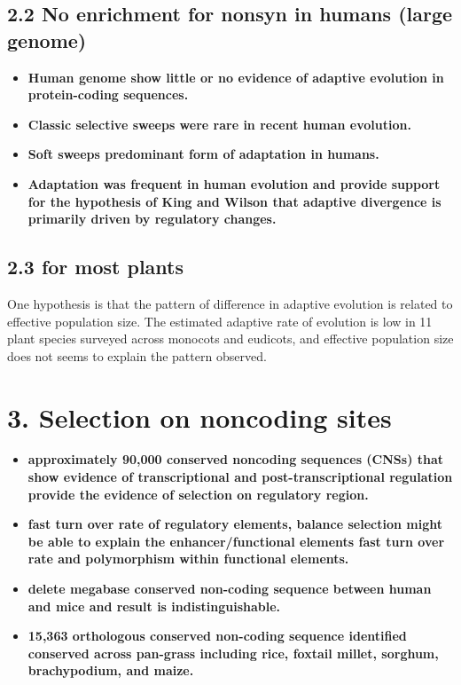 \documentclass[12pt]{article}
\begin{document}
\subsection*{2.2 No enrichment for nonsyn in humans (large genome)}
\begin{itemize}
\item \textbf{Human genome show little or no evidence of adaptive evolution in protein-coding sequences.}

\item \textbf{Classic selective sweeps were rare in recent human evolution.}

\item \textbf{Soft sweeps predominant form of adaptation in humans.}

\item \textbf{Adaptation was frequent in human evolution and provide support for the hypothesis of King and Wilson that adaptive divergence is primarily driven by regulatory changes.}
\end{itemize}

\subsection*{2.3 for most plants}
One hypothesis is that the pattern of difference in adaptive evolution is related to effective population size. The estimated adaptive rate of evolution is low in 11 plant species surveyed across monocots and eudicots, and effective population size does not seems to explain the pattern observed.

\section*{3. Selection on noncoding sites}
\begin{itemize}
\item \textbf{approximately 90,000 conserved noncoding sequences (CNSs) that show evidence of transcriptional and post-transcriptional regulation provide the evidence of selection on regulatory region.}

\item \textbf{fast turn over rate of regulatory elements, balance selection might be able to explain the enhancer/functional elements fast turn over rate and polymorphism within functional elements.}

\item \textbf{delete megabase conserved non-coding sequence between human and mice and result is indistinguishable.}

\item \textbf{15,363 orthologous conserved non-coding sequence identified conserved across pan-grass including rice, foxtail millet, sorghum, brachypodium, and maize.}
\end{itemize}
\end{document}
